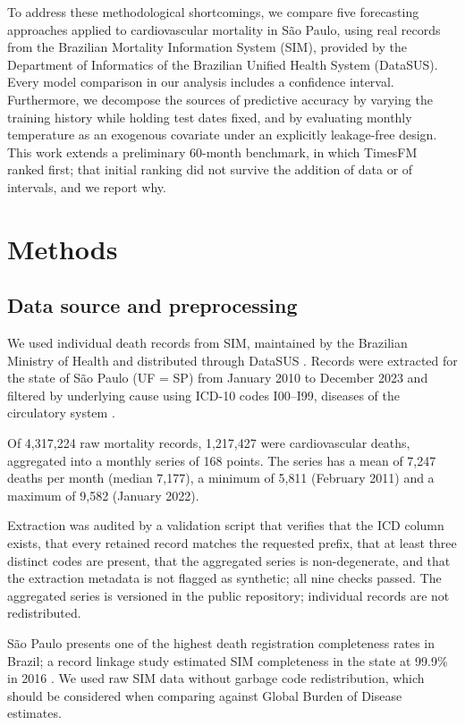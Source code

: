 To address these methodological shortcomings, we compare five forecasting approaches
applied to cardiovascular mortality in S\~ao Paulo, using real records from the Brazilian
Mortality Information System (SIM), provided by the Department of Informatics of the
Brazilian Unified Health System (DataSUS). Every model comparison in our analysis includes a
confidence interval. Furthermore, we decompose the sources of predictive accuracy by varying
the training history while holding test dates fixed, and by evaluating monthly temperature as
an exogenous covariate under an explicitly leakage-free design. This work extends a
preliminary 60-month benchmark, in which TimesFM ranked first; that initial ranking did not
survive the addition of data or of intervals, and we report why.

\section{Methods}\label{sec:metodos}

\subsection{Data source and preprocessing}

We used individual death records from SIM, maintained by the Brazilian Ministry of Health and
distributed through DataSUS \citep{datasus}. Records were extracted for the state of
S\~ao Paulo (UF = SP) from January 2010 to December 2023 and filtered by underlying cause
using ICD-10 codes I00--I99, diseases of the circulatory system \citep{icd10}.

Of 4{,}317{,}224 raw mortality records, 1{,}217{,}427 were cardiovascular deaths, aggregated
into a monthly series of 168 points. The series has a mean of 7{,}247 deaths per month
(median 7{,}177), a minimum of 5{,}811 (February 2011) and a maximum of 9{,}582 (January
2022).

Extraction was audited by a validation script that verifies that the ICD column exists,
that every retained record matches the requested prefix, that at least three distinct codes
are present, that the aggregated series is non-degenerate, and that the extraction metadata
is not flagged as synthetic; all nine checks passed. The aggregated series is versioned in
the public repository; individual records are not redistributed.

S\~ao Paulo presents one of the highest death registration completeness rates in Brazil; a
record linkage study estimated SIM completeness in the state at 99.9\% in 2016
\citep{costa2020}. We used raw SIM data without garbage code
redistribution, which should be considered when comparing against Global Burden of
Disease estimates.

